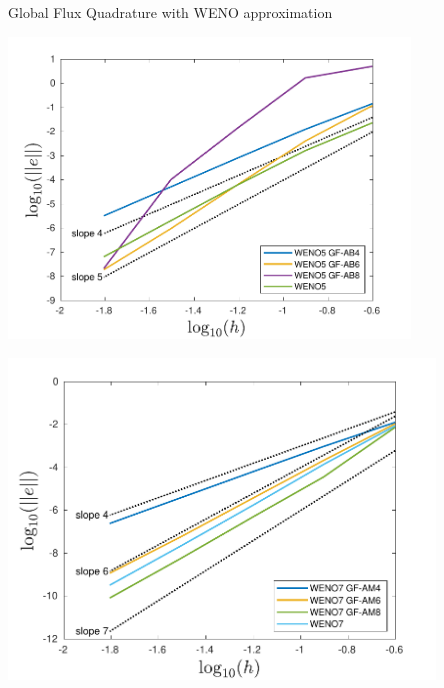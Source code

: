 \begin{frame}[t]{Global Flux Quadrature  with WENO approximation}
{	
	\begin{minipage}{0.5\textwidth}
		\centering\includegraphics[width=0.8\textwidth]{figs/WENO-FD/figures/Burgers/MMS/weno5_AB_MMS_conv} 
	\end{minipage}\hfill
	\begin{minipage}{0.5\textwidth}
		\centering\includegraphics[width=0.85\textwidth]{figs/WENO-FD/figures/Burgers/MMS/weno7_AM_MMS_conv} 
	\end{minipage}
} 
 


\end{frame}
